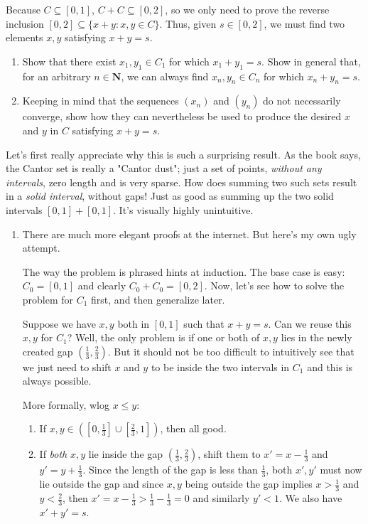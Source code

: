 \documentclass{oxmathproblems}
\begin{document}
\begin{questions}
Because $C \subseteq [0, 1]$, $C + C \subseteq [0, 2]$, so we only need to prove the reverse inclusion $[0, 2] \subseteq \{x+y: x, y \in C\}$. Thus,
given $s \in [0, 2]$, we must find two elements $x, y$ satisfying $x + y = s$.

\begin{enumerate}[label=(\alph*)]
  \item Show that there exist $x_{1}, y_{1} \in C_{1}$ for which $x_{1} + y_{1} = s$. Show in general that, for an arbitrary $n \in \textbf{N}$, we can
  always find $x_{n}, y_{n} \in C_{n}$ for which $x_{n}+y_{n}=s$.
  \item Keeping in mind that the sequences $(x_{n})$ and $(y_{n})$ do not necessarily converge, show how they can nevertheless be used to produce the desired
  $x$ and $y$ in $C$ satisfying $x+y=s$.
\end{enumerate}

\begin{solution}
  Let's first really appreciate why this is such a surprising result. As the book says, the Cantor set is really a "Cantor dust"; just a set of points,
  \textit{without any intervals}, zero length and is very sparse. How does summing two such sets result in a \textit{solid interval}, without gaps! Just as good as summing up
  the two solid intervals $[0, 1] + [0, 1]$. It's visually highly unintuitive.

  \begin{enumerate}[label=(\alph*)]
    \item There are much more elegant proofs at the internet. But here's my own ugly attempt.
    
    The way the problem is phrased hints at induction. The base case is easy: $C_{0} = [0, 1]$ and clearly $C_{0} + C_{0} = [0, 2]$. Now, let's see
    how to solve the problem for $C_{1}$ first, and then generalize later.

    Suppose we have $x, y$ both in $[0, 1]$ such that $x+y=s$. Can we reuse this $x, y$ for $C_{1}$? Well, the only problem is if one or both of $x, y$ lies
    in the newly created gap $(\frac{1}{3}, \frac{2}{3})$. But it should not be too difficult to intuitively see that we just need to shift $x$ and $y$ to be
    inside the two intervals in $C_{1}$ and this is always possible.
    
    More formally, wlog $x \leq y$:
    \begin{enumerate}
      \item If $x, y \in ([0, \frac{1}{3}] \cup [\frac{2}{3}, 1])$, then all good.
      \item If \textit{both} $x, y$ lie inside the gap $(\frac{1}{3}, \frac{2}{3})$, shift them to $x'=x-\frac{1}{3}$ and $y'=y+\frac{1}{3}$. Since the length
      of the gap is less than $\frac{1}{3}$, both $x', y'$ must now lie outside the gap and since $x, y$ being outside the gap implies $x > \frac{1}{3}$ and
      $y < \frac{2}{3}$, then $x' = x-\frac{1}{3} > \frac{1}{3}-\frac{1}{3} = 0$ and similarly $y' < 1$. We also have $x'+y' = s$. 
      

\end{enumerate}
\end{enumerate}
\end{solution}
\end{questions}
\end{document}
